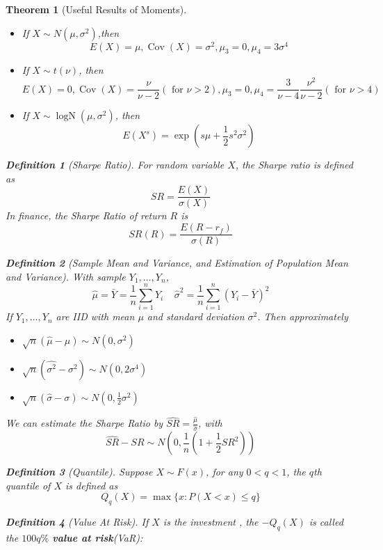 \documentclass[11pt]{article}
\newtheorem{definition}{Definition}[section]
\newtheorem{theorem}{Theorem}[section]
\theoremstyle{definition}
\DeclareMathOperator{\cov}{Cov}
\DeclareMathOperator{\LogN}{logN}
\begin{document}
\begin{theorem}[Useful Results of Moments]
\normalfont
\begin{itemize}
  \item If $X\sim N(\mu,\sigma^2)$,then
  \[
E(X)=\mu, \cov(X)=\sigma^2, \mu_3=0, \mu_4=3\sigma^4
  \]
  \item If $X\sim t(\nu)$, then
  \[
E(X)=0, \cov(X)=\frac{\nu}{\nu-2}(\text{ for }\nu>2), \mu_3=0, \mu_4=\frac{3}{\nu-4}\frac{\nu^2}{\nu-2}(\text{ for }\nu>4)
  \]
  \item If $X\sim\LogN(\mu, \sigma^2)$, then
  \[
E(X^s)=\exp(s\mu +\frac{1}{2}s^2\sigma^2)
  \]
\end{itemize}
\begin{definition}[Sharpe Ratio]
\normalfont For random variable $X$, the Sharpe ratio is defined as
\[
SR=\frac{E(X)}{\sigma(X)}
\]
In finance, the Sharpe Ratio of return $R$ is
\[
SR(R)=\frac{E(R-r_f)}{\sigma(R)}
\]
\end{definition}
\begin{definition}[Sample Mean and Variance, and Estimation of Population Mean and Variance]
With sample $Y_1, \ldots, Y_n$,
\[
\hat{\mu}=\bar{Y}=\frac{1}{n}\sum_{i=1}^n Y_i\;\;\;\;\hat{\sigma}^2 = \frac{1}{n}\sum_{i=1}^n(Y_i-\bar{Y})^2
\]
If $Y_1,\ldots, Y_n$ are IID with mean $\mu$ and standard deviation $\sigma^2$. Then approximately
\begin{itemize}
  \item $\sqrt{n}(\hat{\mu}-\mu)\sim N(0, \sigma^2)$
  \item $\sqrt{n}(\hat{\sigma^2}-\sigma^2)\sim N(0, 2\sigma^4)$
  \item $\sqrt{n}(\hat{\sigma}-\sigma)\sim N(0, \frac{1}{2}\sigma^2)$
\end{itemize}
\end{definition}
We can estimate the Sharpe Ratio by $\hat{SR}=\frac{\hat{\mu}}{\hat{\sigma}}$, with
\[
\hat{SR}-SR\sim N(0,\frac{1}{n}(1+\frac{1}{2}SR^2))
\]
\begin{definition}[Quantile]
Suppose $X\sim F(x)$, for any $0<q<1$, the $q$th quantile of $X$ is defined as
\[
Q_q(X)=\max\{x:P(X<x)\leq q\}
\]
\end{definition}
\begin{definition}[Value At Risk]
\normalfont If $X$ is the investment , the $-Q_q(X)$ is called the $100q\%$ \textbf{value at risk}(VaR):

\end{definition}
\end{theorem}
\end{document}
